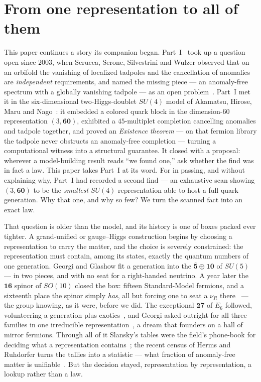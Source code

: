 \documentclass[11pt,a4paper]{article}
\begin{document}
\section{From one representation to all of them}\label{sec:intro}
This paper continues a story its companion began. Part~I~\cite{PartI} took up a question
open since 2003, when Scrucca, Serone, Silvestrini and Wulzer observed that on an orbifold
the vanishing of localized tadpoles and the cancellation of anomalies are \emph{independent}
requirements, and named the missing piece --- an anomaly-free spectrum with a globally
vanishing tadpole --- as an open problem~\cite{SSSW}. Part~I met it in the six-dimensional
two-Higgs-doublet $SU(4)$ model of Akamatsu, Hirose, Maru and Nago~\cite{AHMN}: it embedded
a colored quark block in the dimension-$60$ representation $(3,\mathbf{60})$, exhibited a
$45$-multiplet completion cancelling anomalies and tadpole together, and proved an
\emph{Existence theorem} --- on that fermion library the tadpole never obstructs an
anomaly-free completion --- turning a computational witness into a structural guarantee. It
closed with a proposal: wherever a model-building result reads ``we found one,'' ask whether
the find was in fact a law. This paper takes Part~I at its word. For in passing, and without
explaining why, Part~I had recorded a second find --- an exhaustive scan showing
$(3,\mathbf{60})$ to be the \emph{smallest} $SU(4)$ representation able to host a full quark
generation. Why that one, and why so few? We turn the scanned fact into an exact law.

That question is older than the model, and its history is one of boxes packed ever tighter.
A grand-unified or gauge--Higgs construction begins by choosing a representation to carry the
matter, and the choice is severely constrained: the representation must contain, among its
states, exactly the quantum numbers of one generation. Georgi and Glashow fit a generation
into the $\overline{\mathbf 5}\oplus\mathbf{10}$ of $SU(5)$~\cite{GeorgiGlashow} --- in two
pieces, and with no seat for a right-handed neutrino. A year later the $\mathbf{16}$ spinor
of $SO(10)$ closed the box: fifteen Standard-Model fermions, and a sixteenth place the spinor
simply \emph{has}, all but forcing one to seat a $\nu_R$ there~\cite{SO10FM,SO10G} --- the
group knowing, as it were, before we did. The exceptional $\mathbf{27}$ of $E_6$ followed,
volunteering a generation plus exotics~\cite{E6}, and Georgi asked outright for all three
families in one irreducible representation~\cite{GeorgiFlavor,Yamatsu}, a dream that founders on a
hall of mirror fermions. Through all of it Slansky's tables were the field's phone-book for
deciding what a representation contains~\cite{Slansky}; the recent census of Herms and
Ruhdorfer turns the tallies into a statistic --- what fraction of anomaly-free matter is
unifiable~\cite{HermsRuhdorfer}. But the decision stayed, representation by representation, a
lookup rather than a law.
\end{document}
